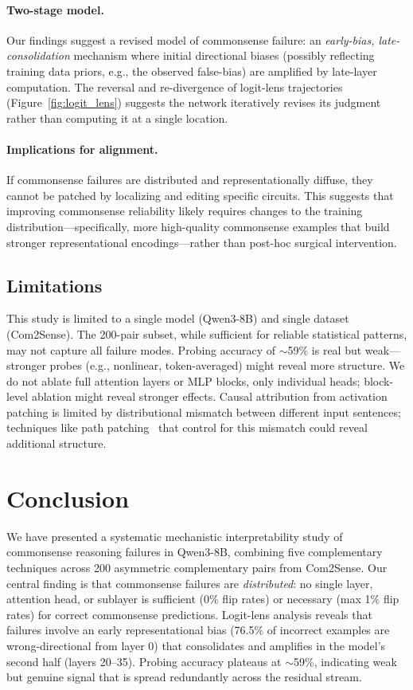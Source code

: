 \documentclass{article}
\begin{document}
\paragraph{Two-stage model.}
Our findings suggest a revised model of commonsense failure: an \emph{early-bias, late-consolidation} mechanism where initial directional biases (possibly reflecting training data priors, e.g., the observed false-bias) are amplified by late-layer computation. The reversal and re-divergence of logit-lens trajectories (Figure~\ref{fig:logit_lens}) suggests the network iteratively revises its judgment rather than computing it at a single location.

\paragraph{Implications for alignment.}
If commonsense failures are distributed and representationally diffuse, they cannot be patched by localizing and editing specific circuits. This suggests that improving commonsense reliability likely requires changes to the training distribution—specifically, more high-quality commonsense examples that build stronger representational encodings—rather than post-hoc surgical intervention.

\subsection{Limitations}

This study is limited to a single model (Qwen3-8B) and single dataset (Com2Sense). The 200-pair subset, while sufficient for reliable statistical patterns, may not capture all failure modes. Probing accuracy of $\sim$59\% is real but weak—stronger probes (e.g., nonlinear, token-averaged) might reveal more structure. We do not ablate full attention layers or MLP blocks, only individual heads; block-level ablation might reveal stronger effects. Causal attribution from activation patching is limited by distributional mismatch between different input sentences; techniques like path patching~\citep{conmy2023towards} that control for this mismatch could reveal additional structure.

\section{Conclusion}
\label{sec:conclusion}

We have presented a systematic mechanistic interpretability study of commonsense reasoning failures in Qwen3-8B, combining five complementary techniques across 200 asymmetric complementary pairs from Com2Sense. Our central finding is that commonsense failures are \emph{distributed}: no single layer, attention head, or sublayer is sufficient (0\% flip rates) or necessary (max 1\% flip rates) for correct commonsense predictions. Logit-lens analysis reveals that failures involve an early representational bias (76.5\% of incorrect examples are wrong-directional from layer 0) that consolidates and amplifies in the model's second half (layers 20--35). Probing accuracy plateaus at $\sim$59\%, indicating weak but genuine signal that is spread redundantly across the residual stream.
\end{document}
